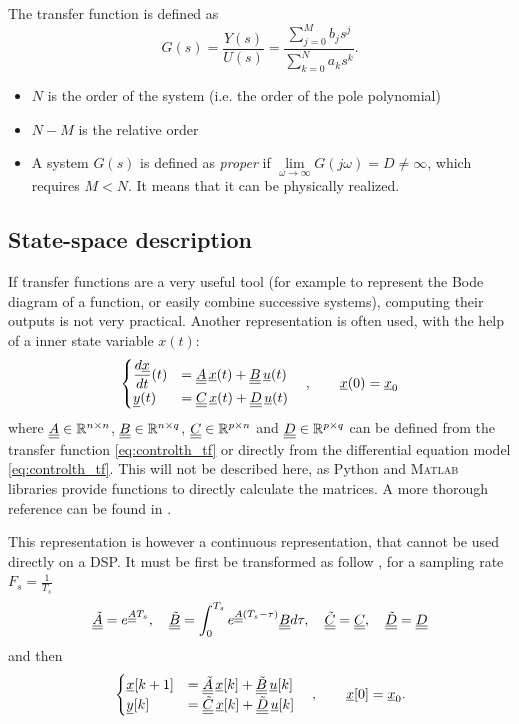 The transfer function is defined as
\begin{equation}
	\label{eq:controlth_tf}
	G(s) = \frac{Y(s)}{U(s)} = \frac{\sum\limits_{j=0}^M b_j s^j}{\sum\limits_{k=0}^N a_k s^k}.
\end{equation}

\begin{itemize}
	\item $N$ is the order of the system (i.e. the order of the pole polynomial) 
	\item $N-M$ is the relative order
	\item A system $G(s)$ is defined as \emph{proper} if $\lim\limits_{\omega \rightarrow \infty} G(j\omega) = D \neq \infty$, which requires $M < N$. It means that it can be physically realized.
\end{itemize}

\subsection{State-space description}
If transfer functions are a very useful tool (for example to represent the Bode diagram of a function, or easily combine successive systems), computing their outputs is not very practical. Another representation is often used, with the help of a inner state variable $x(t)$:
\begin{equation}
\begin{cases}
	\dfrac{d \underline{x}}{dt}(t) &= \underline{\underline{A}}\,\underline{x}(t) + \underline{\underline{B}}\, \underline{u}(t) \\
	\underline{y}(t) &= \underline{\underline{C}}\,\underline{x}(t) + \underline{\underline{D}} \,\underline{u}(t)
\end{cases}
\quad , \qquad \underline{x}(0) = \underline{x}_0
\end{equation}
where $\underline{\underline{A}} \in \mathbb{R}^{n \times n}$, $\underline{\underline{B}} \in \mathbb{R}^{n \times q}$, $\underline{\underline{C}} \in \mathbb{R}^{p \times n}$ and $\underline{\underline{D}} \in \mathbb{R}^{p \times q}$ can be defined from the transfer function \cref{eq:controlth_tf} or directly from the differential equation model \cref{eq:controlth_tf}. This will not be described here, as Python and \textsc{Matlab} libraries provide functions to directly calculate the matrices. A more thorough reference can be found in \cite{lect:king-ident}.

This representation is however a continuous representation, that cannot be used directly on a DSP. It must be first be transformed as follow \cite{lect:king-ident}, for a sampling rate $F_s = \frac{1}{T_s}$ 
\begin{equation}
	\underline{\underline{\tilde{A}}} = e^{\underline{\underline{A}} T_s}, \quad
	\underline{\underline{\tilde{B}}} = \int_0^{T_s} e^{\underline{\underline{A}} (T_s-\tau)} \underline{\underline{B}} d\tau,\quad
	\underline{\underline{\tilde{C}}} = \underline{\underline{C}}, \quad
	\underline{\underline{\tilde{D}}} = \underline{\underline{D}}
\end{equation}
and then 
\begin{equation}
\label{eq:controlth_ss}
	\begin{cases}
		\underline{x}[k+1] &= \underline{\underline{\tilde{A}}}\,\underline{x}[k] + \underline{\underline{\tilde{B}}}\, \underline{u}[k] \\
		\underline{y}[k] &= \underline{\underline{\tilde{C}}}\,\underline{x}[k] + \underline{\underline{\tilde{D}}} \,\underline{u}[k]
	\end{cases}
	\quad , \qquad \underline{x}[0] = \underline{x}_0.
\end{equation}

